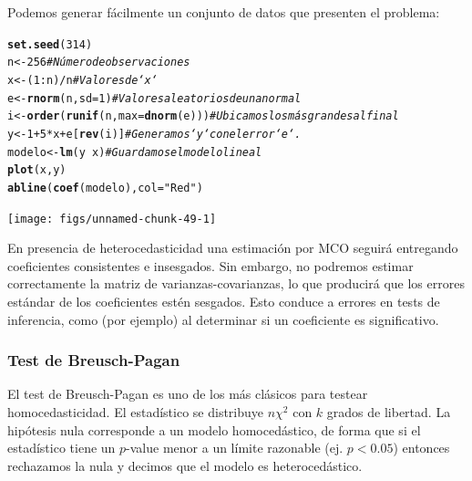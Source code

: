 \documentclass{article}\usepackage[]{graphicx}\usepackage[]{color}
\makeatletter
\newcommand{\hlnum}[1]{\textcolor[rgb]{0.686,0.059,0.569}{#1}}%
\newcommand{\hlstr}[1]{\textcolor[rgb]{0.192,0.494,0.8}{#1}}%
\newcommand{\hlcom}[1]{\textcolor[rgb]{0.678,0.584,0.686}{\textit{#1}}}%
\newcommand{\hlopt}[1]{\textcolor[rgb]{0,0,0}{#1}}%
\newcommand{\hlstd}[1]{\textcolor[rgb]{0.345,0.345,0.345}{#1}}%
\newcommand{\hlkwb}[1]{\textcolor[rgb]{0.69,0.353,0.396}{#1}}%
\newcommand{\hlkwc}[1]{\textcolor[rgb]{0.333,0.667,0.333}{#1}}%
\newcommand{\hlkwd}[1]{\textcolor[rgb]{0.737,0.353,0.396}{\textbf{#1}}}%
\newenvironment{kframe}{%
 \def\at@end@of@kframe{}%
 \ifinner\ifhmode%
  \def\at@end@of@kframe{\end{minipage}}%
  \begin{minipage}{\columnwidth}%
 \fi\fi%
 \def\FrameCommand##1{\hskip\@totalleftmargin \hskip-\fboxsep
 \colorbox{shadecolor}{##1}\hskip-\fboxsep
     \hskip-\linewidth \hskip-\@totalleftmargin \hskip\columnwidth}%
 \MakeFramed {\advance\hsize-\width
   \@totalleftmargin\z@ \linewidth\hsize
   \@setminipage}}%
 {\par\unskip\endMakeFramed%
 \at@end@of@kframe}
\newenvironment{knitrout}{}{} %
\makeatother
\begin{document}
Podemos generar fácilmente un conjunto de datos que presenten el problema:

\begin{knitrout}
\color{fgcolor}\begin{kframe}
\begin{alltt}
\hlkwd{set.seed}\hlstd{(}\hlnum{314}\hlstd{)}
\hlstd{n} \hlkwb{<-} \hlnum{256}                           \hlcom{# Número de observaciones}
\hlstd{x} \hlkwb{<-} \hlstd{(}\hlnum{1}\hlopt{:}\hlstd{n)}\hlopt{/}\hlstd{n}                       \hlcom{# Valores de `x`}
\hlstd{e} \hlkwb{<-} \hlkwd{rnorm}\hlstd{(n,} \hlkwc{sd}\hlstd{=}\hlnum{1}\hlstd{)}                \hlcom{# Valores aleatorios de una normal}
\hlstd{i} \hlkwb{<-} \hlkwd{order}\hlstd{(}\hlkwd{runif}\hlstd{(n,} \hlkwc{max}\hlstd{=}\hlkwd{dnorm}\hlstd{(e)))} \hlcom{# Ubicamos los más grandes al final}
\hlstd{y} \hlkwb{<-} \hlnum{1} \hlopt{+} \hlnum{5} \hlopt{*} \hlstd{x} \hlopt{+} \hlstd{e[}\hlkwd{rev}\hlstd{(i)]}         \hlcom{# Generamos `y` con el error `e`.}
\hlstd{modelo} \hlkwb{<-} \hlkwd{lm}\hlstd{(y} \hlopt{~} \hlstd{x)}                \hlcom{# Guardamos el modelo lineal}
\hlkwd{plot}\hlstd{(x, y)}
\hlkwd{abline}\hlstd{(}\hlkwd{coef}\hlstd{(modelo),} \hlkwc{col} \hlstd{=} \hlstr{"Red"}\hlstd{)}
\end{alltt}
\end{kframe}

{\centering \texttt{[image: figs/unnamed-chunk-49-1]} 

}



\end{knitrout}

En presencia de heterocedasticidad una estimación por MCO seguirá entregando coeficientes consistentes e insesgados. Sin embargo, no podremos estimar correctamente la matriz de varianzas-covarianzas, lo que producirá que los errores estándar de los coeficientes estén sesgados. Esto conduce a errores en tests de inferencia, como (por ejemplo) al determinar si un coeficiente es significativo.


\subsubsection{Test de Breusch-Pagan}

El test de Breusch-Pagan es uno de los más clásicos para testear homocedasticidad. El estadístico se distribuye $n\chi^2$ con $k$ grados de libertad. La hipótesis nula corresponde a un modelo homocedástico, de forma que si el estadístico tiene un $p$-value menor a un límite razonable (ej. $p<0.05$) entonces rechazamos la nula y decimos que el modelo es heterocedástico.
\end{document}
